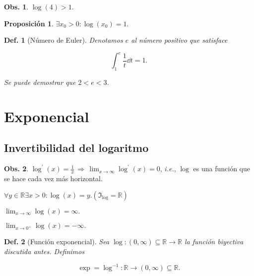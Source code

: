 \documentclass{article}
\theoremstyle{definicion}
\newtheorem{definicion}{Def.}
\theoremstyle{definition}             %
\theoremstyle{definition}             %
\theoremstyle{definition}
\theoremstyle{definition}
\theoremstyle{observacion}
\newtheorem{obs}{Obs.}
\theoremstyle{definition}
\newtheorem{prop}{Proposición}
\theoremstyle{plain}
\theoremstyle{definition}
\theoremstyle{afirmacion}
\theoremstyle{definition}
\begin{document}
    \begin{obs}
        \(\log(4) > 1.\)
    \end{obs}

    \begin{prop}
        \(\exists x_{0} > 0 \colon \log(x_{0}) = 1.\)
    \end{prop}

    \begin{definicion}[Número de Euler] 
        Denotamos \(e\) al número positivo que satisface 

        \begin{equation*}
            \int_{1}^{e} \dfrac{1}{t}\dd{t} = 1.
        \end{equation*}

        Se puede demostrar que \(2 < e < 3\).
    \end{definicion}

    \section{Exponencial}
    \subsection{Invertibilidad del logaritmo}

    \begin{obs}
        \(\log^{\prime}(x) = \frac{1}{x}\, \Rightarrow\, \lim_{x\to\infty}\log^{\prime}(x) = 0\), \emph{i.e.}, \(\log\) es una función que se hace cada vez más horizontal.
    \end{obs}

    \begin{aff}
        \(\forall y \in \mathbb{R} \exists x > 0 \colon  \log(x) = y. (\Im_{\log} = \mathbb{R})\)
    \end{aff}

    \begin{aff}
        \(\lim_{x\to\infty} \log(x) = \infty.\)
    \end{aff}

    \begin{aff}
        \(\lim_{x \to 0^{+}}\log(x) = -\infty.\)
    \end{aff}

    \begin{definicion}[Función exponencial]
        Sea \(\log \colon (0, \infty) \subseteq \mathbb{R} \to \mathbb{R}\) la función biyectiva discutida antes. Definimos 

        \begin{equation*}
            \exp = \log^{-1} \colon \mathbb{R} \to (0,\infty) \subseteq \mathbb{R}.
        \end{equation*}
    \end{definicion}
\end{document}
